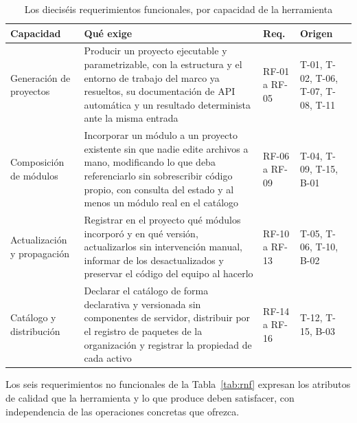 \begin{table}[H]
\centering
{\footnotesize
\begin{tabular}{p{3.1cm}p{7.6cm}p{1.6cm}p{2.3cm}}
\toprule
\textbf{Capacidad} & \textbf{Qué exige} & \textbf{Req.} & \textbf{Origen} \\
\midrule
Generación de proyectos & Producir un proyecto ejecutable y parametrizable, con la estructura y el entorno de trabajo del marco ya resueltos, su documentación de API automática y un resultado determinista ante la misma entrada & RF-01 a RF-05 & T-01, T-02, T-06, T-07, T-08, T-11 \\
Composición de módulos & Incorporar un módulo a un proyecto existente sin que nadie edite archivos a mano, modificando lo que deba referenciarlo sin sobrescribir código propio, con consulta del estado y al menos un módulo real en el catálogo & RF-06 a RF-09 & T-04, T-09, T-15, B-01 \\
Actualización y propagación & Registrar en el proyecto qué módulos incorporó y en qué versión, actualizarlos sin intervención manual, informar de los desactualizados y preservar el código del equipo al hacerlo & RF-10 a RF-13 & T-05, T-06, T-10, B-02 \\
Catálogo y distribución & Declarar el catálogo de forma declarativa y versionada sin componentes de servidor, distribuir por el registro de paquetes de la organización y registrar la propiedad de cada activo & RF-14 a RF-16 & T-12, T-15, B-03 \\
\bottomrule
\end{tabular}
}
\caption{Los dieciséis requerimientos funcionales, por capacidad de la herramienta}
\label{tab:rf}
\end{table}

Los seis requerimientos no funcionales de la Tabla~\ref{tab:rnf} expresan los
atributos de calidad que la herramienta y lo que produce deben satisfacer,
con independencia de las operaciones concretas que ofrezca.

